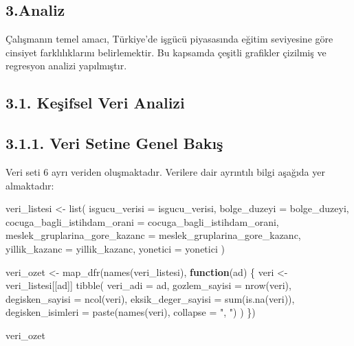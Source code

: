\documentclass[
  11pt,
  a4paper,
  DIV=11,
  numbers=noendperiod]{scrartcl}
\newenvironment{Shaded}{\begin{snugshade}}{\end{snugshade}}
\newcommand{\AttributeTok}[1]{\textcolor[rgb]{0.40,0.45,0.13}{#1}}
\newcommand{\ControlFlowTok}[1]{\textcolor[rgb]{0.00,0.23,0.31}{\textbf{#1}}}
\newcommand{\FunctionTok}[1]{\textcolor[rgb]{0.28,0.35,0.67}{#1}}
\newcommand{\NormalTok}[1]{\textcolor[rgb]{0.00,0.23,0.31}{#1}}
\newcommand{\OtherTok}[1]{\textcolor[rgb]{0.00,0.23,0.31}{#1}}
\newcommand{\StringTok}[1]{\textcolor[rgb]{0.13,0.47,0.30}{#1}}
\begin{document}
\subsection{3.Analiz}\label{analiz}

Çalışmanın temel amacı, Türkiye'de işgücü piyasasında eğitim seviyesine
göre cinsiyet farklılıklarını belirlemektir. Bu kapsamda çeşitli
grafikler çizilmiş ve regresyon analizi yapılmıştır.

\subsection{3.1. Keşifsel Veri Analizi}\label{keux15fifsel-veri-analizi}

\subsection{3.1.1. Veri Setine Genel
Bakış}\label{veri-setine-genel-bakux131ux15f}

Veri seti 6 ayrı veriden oluşmaktadır. Verilere dair ayrıntılı bilgi
aşağıda yer almaktadır:

\begin{Shaded}
\begin{Highlighting}[]
\NormalTok{veri\_listesi }\OtherTok{\textless{}{-}} \FunctionTok{list}\NormalTok{(}
  \AttributeTok{isgucu\_verisi =}\NormalTok{ isgucu\_verisi,}
  \AttributeTok{bolge\_duzeyi =}\NormalTok{ bolge\_duzeyi,}
  \AttributeTok{cocuga\_bagli\_istihdam\_orani =}\NormalTok{ cocuga\_bagli\_istihdam\_orani,}
  \AttributeTok{meslek\_gruplarina\_gore\_kazanc =}\NormalTok{ meslek\_gruplarina\_gore\_kazanc,}
  \AttributeTok{yillik\_kazanc =}\NormalTok{ yillik\_kazanc,}
  \AttributeTok{yonetici =}\NormalTok{ yonetici}
\NormalTok{)}

\NormalTok{veri\_ozet }\OtherTok{\textless{}{-}} \FunctionTok{map\_dfr}\NormalTok{(}\FunctionTok{names}\NormalTok{(veri\_listesi), }\ControlFlowTok{function}\NormalTok{(ad) \{}
\NormalTok{  veri }\OtherTok{\textless{}{-}}\NormalTok{ veri\_listesi[[ad]]}
  \FunctionTok{tibble}\NormalTok{(}
    \AttributeTok{veri\_adi =}\NormalTok{ ad,}
    \AttributeTok{gozlem\_sayisi =} \FunctionTok{nrow}\NormalTok{(veri),}
    \AttributeTok{degisken\_sayisi =} \FunctionTok{ncol}\NormalTok{(veri),}
    \AttributeTok{eksik\_deger\_sayisi =} \FunctionTok{sum}\NormalTok{(}\FunctionTok{is.na}\NormalTok{(veri)),}
    \AttributeTok{degisken\_isimleri =} \FunctionTok{paste}\NormalTok{(}\FunctionTok{names}\NormalTok{(veri), }\AttributeTok{collapse =} \StringTok{", "}\NormalTok{)}
\NormalTok{  )}
\NormalTok{\})}

\NormalTok{veri\_ozet}
\end{Highlighting}
\end{Shaded}
\end{document}
